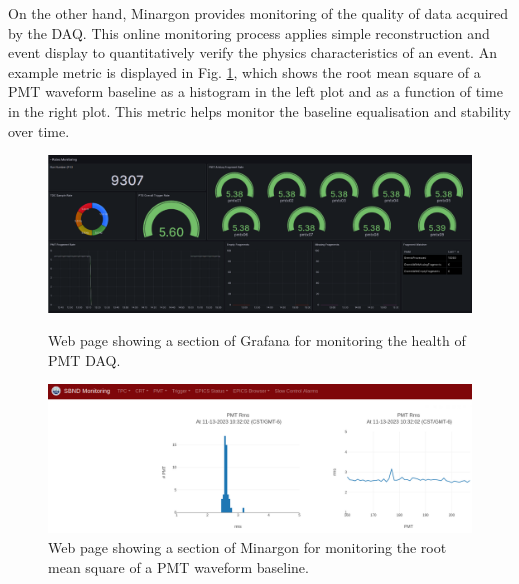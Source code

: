 On the other hand, Minargon provides monitoring of the quality of data acquired by the DAQ. 
This online monitoring process applies simple reconstruction and event display to quantitatively verify the physics characteristics of an event. 
An example metric is displayed in Fig. \ref{fig:Minargon}, which shows the root mean square of a PMT waveform baseline as a histogram in the left plot and as a function of time in the right plot.
This metric helps monitor the baseline equalisation and stability over time.

\begin{figure}[ht!] 
\centering    
\includegraphics[width=1.0\textwidth]{Grafana}
\caption[Grafana Online Monitoring Web Page]{
Web page showing a section of Grafana for monitoring the health of PMT DAQ.
}
\label{fig:Grafana}
\vspace{0.5cm}
\centering    
\includegraphics[width=1.0\textwidth]{Minargon}
\caption[Minargon Online Monitoring Web Page]{
Web page showing a section of Minargon for monitoring the root mean square of a PMT waveform baseline.
}
\label{fig:Minargon}
\end{figure}


